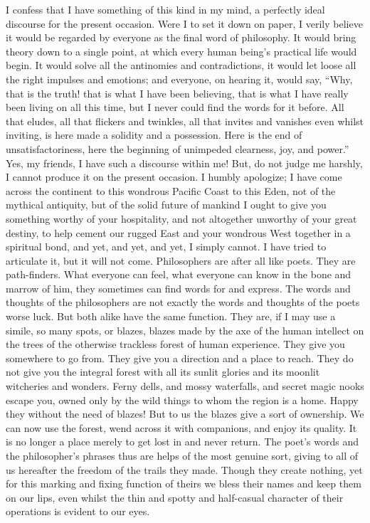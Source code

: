 \documentclass[]{article}
\begin{document}
I confess that I have something of this kind in my mind, a perfectly ideal discourse for the present occasion. Were I to set it down on paper, I verily believe it would be regarded by everyone as the final word of philosophy. It would bring theory down to a single point, at which every human being's practical life would begin. It would solve all the antinomies and contradictions, it would let loose all the right impulses and emotions; and everyone, on hearing it, would say, ``Why, that is the truth! that is what I have been believing, that is what I have really been living on all this time, but I never could find the words for it before. All that eludes, all that flickers and twinkles, all that invites and vanishes even whilst inviting, is here made a solidity and a possession. Here is the end of unsatisfactoriness, here the beginning of unimpeded clearness, joy, and power.'' Yes, my friends, I have such a discourse within me! But, do not judge me harshly, I cannot produce it on the present occasion. I humbly apologize; I have come across the continent to this wondrous Pacific Coast to this Eden, not of the mythical antiquity, but of the solid future of mankind I ought to give you something worthy of your hospitality, and not altogether unworthy of your great destiny, to help cement our rugged East and your wondrous West together in a spiritual bond, and yet, and yet, and yet, I simply cannot. I have tried to articulate it, but it will not come. Philosophers are after all like poets. They are path-finders. What everyone can feel, what everyone can know in the bone and marrow of him, they sometimes can find words for and express. The words and thoughts of the philosophers are not exactly the words and thoughts of the poets worse luck. But both alike have the same function. They are, if I may use a simile, so many spots, or blazes, blazes made by the axe of the human intellect on the trees of the otherwise trackless forest of human experience. They give you somewhere to go from. They give you a direction and a place to reach. They do not give you the integral forest with all its sunlit glories and its moonlit witcheries and wonders. Ferny dells, and mossy waterfalls, and secret magic nooks escape you, owned only by the wild things to whom the region is a home. Happy they without the need of blazes! But to us the blazes give a sort of ownership. We can now use the forest, wend across it with companions, and enjoy its quality. It is no longer a place merely to get lost in and never return. The poet's words and the philosopher's phrases thus are helps of the most genuine sort, giving to all of us hereafter the freedom of the trails they made. Though they create nothing, yet for this marking and fixing function of theirs we bless their names and keep them on our lips, even whilst the thin and spotty and half-casual character of their operations is evident to our eyes. 
\end{document}
